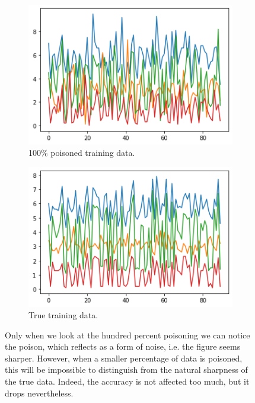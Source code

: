 \documentclass[12pt,reqno]{amsart}
\begin{document}
\begin{enumerate}[label=(\alph*)]
\begin{figure}
\centering
\begin{subfigure}{.5\textwidth}
  \centering
  \includegraphics[width=.8\linewidth]{cleanlabel.png}
  \caption{100\% poisoned training data.}
  \label{fig:sub1}
\end{subfigure}%
\begin{subfigure}{.5\textwidth}
  \centering
  \includegraphics[width=.8\linewidth]{train.png}
  \caption{True training data.}
  \label{fig:sub2}
\end{subfigure}
\caption{Only when we look at the hundred percent poisoning we can notice the poison, which reflects as a form of noise, i.e. the figure seems sharper. However, when a smaller percentage of data is poisoned, this will be impossible to distinguish from the natural sharpness of the true data. Indeed, the accuracy is not affected too much, but it drops nevertheless.}
\label{fig:test}
\end{figure}


\end{enumerate}
\end{document}

